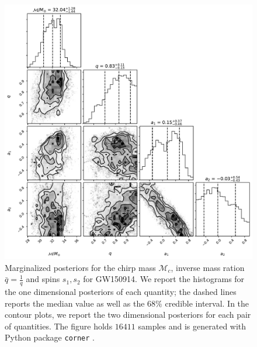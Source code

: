 \par
\begin{figure}
	\centering
    \includegraphics[width=.75\linewidth, trim = {3cm 0cm 3cm 0cm}]{img/intrinsic.pdf}
	\caption{
Marginalized posteriors for the chirp mass $\mathcal{M}_c$, inverse mass ration $\bar{q}=\frac{1}{q}$ and spins $s_1, s_2$ for GW150914. We report the histograms for the one dimensional posteriors of each quantity; the dashed lines reports the median value as well as the $68\%$ credible interval.
In the contour plots, we report the two dimensional posteriors for each pair of quantities.
The figure holds $16411$ samples and is generated with Python package \texttt{corner} \cite{pycorner}.
}
	\label{fig:PDF_BBH}
\end{figure}
